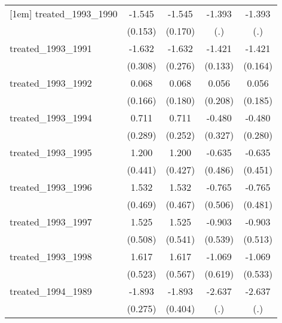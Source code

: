 {\begin{tabular}{l*{4}{c}}
[1em]
treated\_1993\_1990&      -1.545\sym{***}&      -1.545\sym{***}&      -1.393         &      -1.393         \\
            &     (0.153)         &     (0.170)         &         (.)         &         (.)         \\
[1em]
treated\_1993\_1991&      -1.632\sym{***}&      -1.632\sym{***}&      -1.421\sym{***}&      -1.421\sym{***}\\
            &     (0.308)         &     (0.276)         &     (0.133)         &     (0.164)         \\
[1em]
treated\_1993\_1992&       0.068         &       0.068         &       0.056         &       0.056         \\
            &     (0.166)         &     (0.180)         &     (0.208)         &     (0.185)         \\
[1em]
treated\_1993\_1994&       0.711\sym{*}  &       0.711\sym{**} &      -0.480         &      -0.480         \\
            &     (0.289)         &     (0.252)         &     (0.327)         &     (0.280)         \\
[1em]
treated\_1993\_1995&       1.200\sym{**} &       1.200\sym{**} &      -0.635         &      -0.635         \\
            &     (0.441)         &     (0.427)         &     (0.486)         &     (0.451)         \\
[1em]
treated\_1993\_1996&       1.532\sym{**} &       1.532\sym{**} &      -0.765         &      -0.765         \\
            &     (0.469)         &     (0.467)         &     (0.506)         &     (0.481)         \\
[1em]
treated\_1993\_1997&       1.525\sym{**} &       1.525\sym{**} &      -0.903         &      -0.903         \\
            &     (0.508)         &     (0.541)         &     (0.539)         &     (0.513)         \\
[1em]
treated\_1993\_1998&       1.617\sym{**} &       1.617\sym{**} &      -1.069         &      -1.069\sym{*}  \\
            &     (0.523)         &     (0.567)         &     (0.619)         &     (0.533)         \\
[1em]
treated\_1994\_1989&      -1.893\sym{***}&      -1.893\sym{***}&      -2.637         &      -2.637         \\
            &     (0.275)         &     (0.404)         &         (.)         &         (.)         \\

\end{tabular}}
